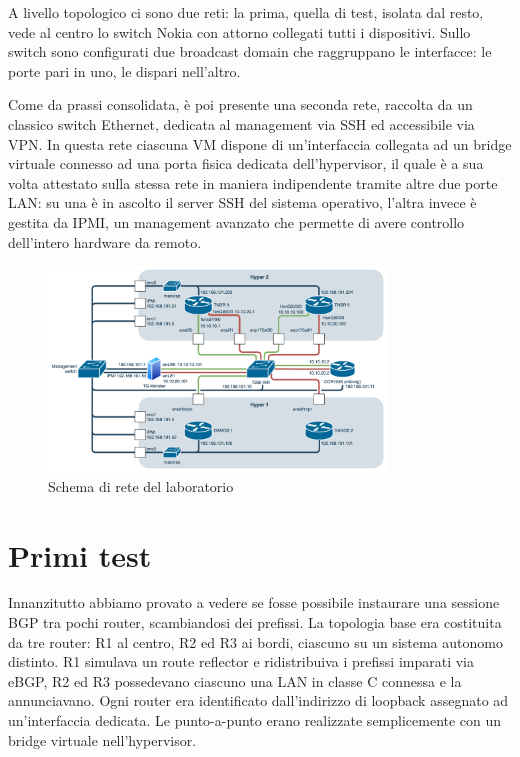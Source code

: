 A livello topologico ci sono due reti: la prima, quella di test, isolata dal resto, vede al centro lo switch Nokia con attorno collegati tutti i dispositivi. Sullo switch sono configurati due broadcast domain che raggruppano le interfacce: le porte pari in uno, le dispari nell'altro. 

Come da prassi consolidata, è poi presente una seconda rete, raccolta da un classico switch Ethernet, dedicata al management via SSH ed accessibile via VPN. In questa rete ciascuna VM dispone di un'interfaccia collegata ad un bridge virtuale connesso ad una porta fisica dedicata dell'hypervisor, il quale è a sua volta attestato sulla stessa rete in maniera indipendente tramite altre due porte LAN: su una è in ascolto il server SSH del sistema operativo, l'altra invece è gestita da IPMI, un management avanzato che permette di avere controllo dell'intero hardware da remoto.

\begin{figure}[htb]
    \includegraphics[width=0.8\textwidth]{graphics/vlan-191.png}
    \caption{Schema di rete del laboratorio}
    \label{fig:vlan-191}
\end{figure}

\section{Primi test}

Innanzitutto abbiamo provato a vedere se fosse possibile instaurare una sessione BGP tra pochi router, scambiandosi dei prefissi. La topologia base era costituita da tre router: R1 al centro, R2 ed R3 ai bordi, ciascuno su un sistema autonomo distinto. R1 simulava un route reflector e ridistribuiva i prefissi imparati via eBGP, R2 ed R3 possedevano ciascuno una LAN in classe C connessa e la annunciavano. Ogni router era identificato dall'indirizzo di loopback assegnato ad un'interfaccia dedicata. Le punto-a-punto erano realizzate semplicemente con un bridge virtuale nell'hypervisor.

